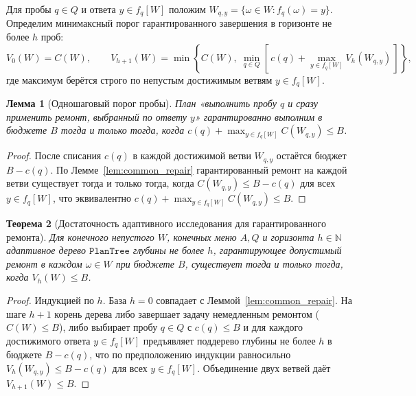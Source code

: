 \documentclass[11pt,a4paper]{article}
\theoremstyle{preprintthm}
\newtheorem{theorem}{Теорема}[section]
\newtheorem{lemma}[theorem]{Лемма}
\theoremstyle{preprintdef}
\begin{document}
Для пробы $q\in Q$ и ответа $y\in f_q[W]$ положим $W_{q,y}=\{\omega\in W : f_q(\omega)=y\}$. Определим минимаксный порог гарантированного завершения в горизонте не более $h$ проб:
\begin{equation}
  V_0(W) = C(W),
  \qquad
  V_{h+1}(W) = \min\!\left\{ C(W),\; \min_{q\in Q}\!\left[\, c(q) + \max_{y\in f_q[W]} V_h(W_{q,y}) \,\right] \right\},
\end{equation}
где максимум берётся строго по непустым достижимым ветвям $y\in f_q[W]$.

\begin{lemma}[Одношаговый порог пробы]
\label{lem:one_step}
План «выполнить пробу $q$ и сразу применить ремонт, выбранный по ответу $y$» гарантированно выполним в бюджете $B$ тогда и только тогда, когда $c(q)+\max_{y\in f_q[W]} C(W_{q,y}) \le B$.
\end{lemma}
\begin{proof}
После списания $c(q)$ в каждой достижимой ветви $W_{q,y}$ остаётся бюджет $B-c(q)$. По Лемме~\ref{lem:common_repair} гарантированный ремонт на каждой ветви существует тогда и только тогда, когда $C(W_{q,y})\le B-c(q)$ для всех $y\in f_q[W]$, что эквивалентно $c(q)+\max_{y\in f_q[W]} C(W_{q,y})\le B$.
\end{proof}

\begin{theorem}[Достаточность адаптивного исследования для гарантированного ремонта]
\label{thm:minimax_main}
Для конечного непустого $W$, конечных меню $A,Q$ и горизонта $h\in\mathbb{N}$ адаптивное дерево $\texttt{PlanTree}$ глубины не более $h$, гарантирующее допустимый ремонт в каждом $\omega\in W$ при бюджете $B$, существует тогда и только тогда, когда $V_h(W)\le B$.
\end{theorem}
\begin{proof}
Индукцией по $h$. База $h=0$ совпадает с Леммой~\ref{lem:common_repair}. На шаге $h+1$ корень дерева либо завершает задачу немедленным ремонтом ($C(W)\le B$), либо выбирает пробу $q\in Q$ с $c(q)\le B$ и для каждого достижимого ответа $y\in f_q[W]$ предъявляет поддерево глубины не более $h$ в бюджете $B-c(q)$, что по предположению индукции равносильно $V_h(W_{q,y})\le B-c(q)$ для всех $y\in f_q[W]$. Объединение двух ветвей даёт $V_{h+1}(W)\le B$.
\end{proof}
\end{document}

